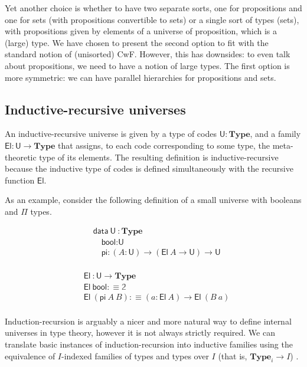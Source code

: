 \documentclass{easychair}
\newcommand{\mType}{\mathbf{Type}}
\newcommand{\U}{\textsf{U}}
\newcommand{\El}{\textsf{El}}
\providecommand\mathbbm{\mathbb}
\begin{document}
Yet another choice is whether to have two separate sorts, one for propositions
and one for sets (with propositions convertible to sets) or a single sort of
types (sets), with propositions given by elements of a universe of proposition,
which is a (large) type. We have chosen to present the second option to fit with
the standard notion of (unisorted) CwF. However, this has downsides: to even
talk about propositions, we need to have a notion of large types. The first
option is more symmetric: we can have parallel hierarchies for propositions and
sets.

\subsection{Inductive-recursive universes}\label{ir-universes}

An inductive-recursive universe is given by a type of codes $\U : \mType$, and a
family $\El : \U \to \mType$ that assigns, to each code corresponding to some
type, the meta-theoretic type of its elements. The resulting definition is
inductive-recursive because the inductive type of codes is defined
simultaneously with the recursive function $\El$.

As an example, consider the following definition of a small universe with
booleans and $\Pi$ types.

\begin{minipage}{0.45\textwidth}
\begin{align*}
  & \textsf{data}\ \U\ : \mType \\
  & \quad \textsf{bool} : \U \\
  & \quad \textsf{pi} : (A : \U) \to (\El\ A \to \U) \to \U \\
\end{align*}
\end{minipage}
\begin{minipage}{0.45\textwidth}
\begin{align*}
  & \El\ : \U \to \mType \\
  & \El\ \textsf{bool} :\equiv \mathbbm{2} \\
  & \El\ (\textsf{pi}\ A\ B) :\equiv (a : \El\ A) \to \El\ (B\ a) \\
\end{align*}
\end{minipage}

Induction-recursion is arguably a nicer and more natural way to define internal
universes in type theory, however it is not always strictly required.
%
We can translate basic instances of induction-recursion into inductive families
using the equivalence of $I$-indexed families of types and types over $I$
(that is, $\mType_i \to I$) \cite{malatasta13smallir}.
\end{document}

